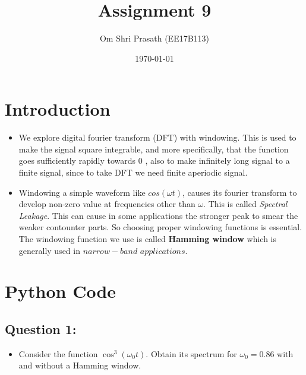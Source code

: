 \documentclass[11pt, a4paper]{article}
\title{Assignment 9} %
\author{Om Shri Prasath (EE17B113)} %
\date{\today} %
\begin{document}
	

\maketitle %
\section{Introduction}\label{introduction}

\begin{itemize}
  \item
    We explore digital fourier transform (DFT) with windowing. This is
    used to make the signal square integrable, and more specifically, that
    the function goes sufficiently rapidly towards 0 , also to make
    infinitely long signal to a finite signal, since to take DFT we need
    finite aperiodic signal.
  \item
    Windowing a simple waveform like \(cos(\omega t)\), causes its fourier
    transform to develop non-zero value at frequencies other than
    \(\omega\). This is called \emph{Spectral Leakage}. This can cause in
    some applications the stronger peak to smear the weaker contounter
    parts. So choosing proper windowing functions is essential. The
    windowing function we use is called \textbf{Hamming window} which is
    generally used in \(narrow-band\) \(applications\).
  \end{itemize}
 
\newpage
\section{Python Code}\label{code}

\subsection{Question 1:}\label{question-1}
\begin{itemize}
  \item
    Consider the function \(\cos^3(\omega_0 t)\). Obtain its spectrum for
    \(\omega_0 = 0.86\) with and without a Hamming window.
  \end{itemize}
\end{document}

